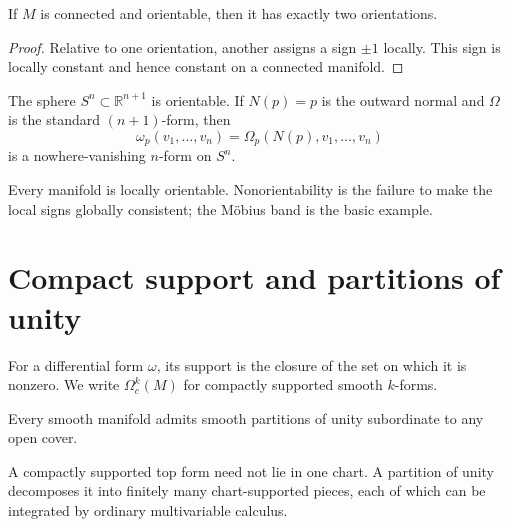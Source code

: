 \begin{proposition}\label{prop:vii10-two-orientations}
If $M$ is connected and orientable, then it has exactly two orientations.
\end{proposition}
\begin{proof}
Relative to one orientation, another assigns a sign $\pm1$ locally. This sign is locally constant and hence constant on a connected manifold.
\end{proof}

\begin{example}[Sphere]\label{ex:vii10-sphere}
The sphere $S^n\subset\mathbb R^{n+1}$ is orientable. If $N(p)=p$ is the outward normal and $\Omega$ is the standard $(n+1)$-form, then
\[
\omega_p(v_1,\ldots,v_n)=\Omega_p(N(p),v_1,\ldots,v_n)
\]
is a nowhere-vanishing $n$-form on $S^n$.
\end{example}

\begin{warning}\label{warning:vii10-global}
Every manifold is locally orientable. Nonorientability is the failure to make the local signs globally consistent; the M\"obius band is the basic example.
\end{warning}

\section{Compact support and partitions of unity}
\begin{definition}\label{def:vii10-compact-support}
For a differential form $\omega$, its support is the closure of the set on which it is nonzero. We write $\Omega_c^k(M)$ for compactly supported smooth $k$-forms.
\end{definition}

\begin{theorem}\label{thm:vii10-partition-unity}
Every smooth manifold admits smooth partitions of unity subordinate to any open cover.
\end{theorem}

\begin{remark}\label{rem:vii10-pou-role}
A compactly supported top form need not lie in one chart. A partition of unity decomposes it into finitely many chart-supported pieces, each of which can be integrated by ordinary multivariable calculus.
\end{remark}

